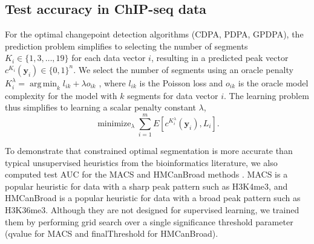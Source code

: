 \documentclass{article}
\DeclareMathOperator*{\argmin}{arg\,min}
\DeclareMathOperator*{\minimize}{minimize}
\begin{document}
\subsection{Test accuracy in ChIP-seq data}


For the optimal changepoint detection algorithms (CDPA, PDPA, GPDPA),
the prediction problem simplifies to selecting the number of segments
$K_i\in \{1, 3,\dots, 19\}$ for each data vector $i$, resulting in a
predicted peak vector $c^{K_i}(\mathbf y_i)\in\{0,1\}^n$. We select the
number of segments using an oracle penalty
$K_i^\lambda=\argmin_k l_{ik} + \lambda o_{ik}$
\citep{cleynen2013segmentation}, where $l_{ik}$ is the Poisson loss and
$o_{ik}$ is the oracle model complexity for the model with $k$
segments for data vector $i$. 
The learning problem thus simplifies to learning a scalar
penalty constant $\lambda$,
\begin{equation}
  \label{eq:learn-lambda}
  \minimize_{\lambda}
  \sum_{i=1}^m E\left[
    c^{K_i^\lambda}(\mathbf y_i), 
    L_i\right].
\end{equation}


To demonstrate that constrained optimal segmentation is more accurate
than typical unsupervised heuristics from the bioinformatics
literature, we also computed test AUC for the MACS and HMCanBroad
methods \citep{MACS, HMCan}. MACS is a popular heuristic for data with
a sharp peak pattern such as H3K4me3, and \mbox{HMCanBroad} is a
popular heuristic for data with a broad peak pattern such as
H3K36me3. Although they are not designed for supervised
learning, we trained them by performing grid search over a single
significance threshold parameter (qvalue for MACS and finalThreshold
for HMCanBroad).
\end{document}
